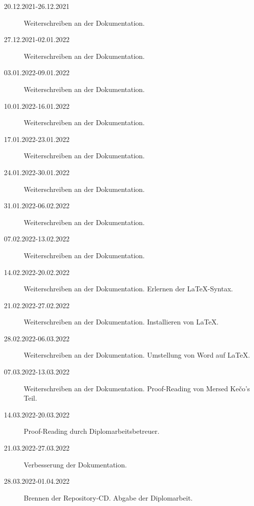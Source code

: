 \begin{description}
    \item[20.12.2021-26.12.2021] Weiterschreiben an der Dokumentation.
    \item[27.12.2021-02.01.2022] Weiterschreiben an der Dokumentation.
    \item[03.01.2022-09.01.2022] Weiterschreiben an der Dokumentation.
    \item[10.01.2022-16.01.2022] Weiterschreiben an der Dokumentation.
    \item[17.01.2022-23.01.2022] Weiterschreiben an der Dokumentation.
    \item[24.01.2022-30.01.2022] Weiterschreiben an der Dokumentation.
    \item[31.01.2022-06.02.2022] Weiterschreiben an der Dokumentation.
    \item[07.02.2022-13.02.2022] Weiterschreiben an der Dokumentation.
    \item[14.02.2022-20.02.2022] Weiterschreiben an der Dokumentation. Erlernen der LaTeX-Syntax.
    \item[21.02.2022-27.02.2022] Weiterschreiben an der Dokumentation. Installieren von LaTeX. 
    \item[28.02.2022-06.03.2022] Weiterschreiben an der Dokumentation. Umstellung von Word auf LaTeX.
    \item[07.03.2022-13.03.2022] Weiterschreiben an der Dokumentation. Proof-Reading von Mersed Kečo’s Teil.
    \item[14.03.2022-20.03.2022] Proof-Reading durch Diplomarbeitsbetreuer.
    \item[21.03.2022-27.03.2022] Verbesserung der Dokumentation.
    \item[28.03.2022-01.04.2022] Brennen der Repository-CD. Abgabe der Diplomarbeit.     
\end{description}